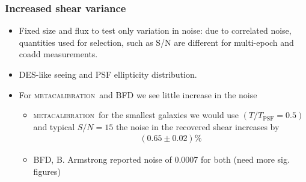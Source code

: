 \documentclass{beamer}
\newcommand{\mcal}{\textsc{metacalibration}}
\begin{document}
\frame
{
    \frametitle{Increased shear variance}

 
    \begin{itemize}

        \item Fixed size and flux to test only variation in noise: due to correlated
            noise, quantities used for selection, such as S/N are different for multi-epoch
            and coadd measurements.
            
        \item DES-like
            seeing and PSF ellipticity distribution.

        \item For \mcal\ and BFD we see little increase in the noise
            \begin{itemize}

                \item \mcal\ for the smallest galaxies we would use $(T/T_{\textrm{PSF}} = 0.5)$ and typical $S/N = 15$
                    the noise in the recovered shear increases by 
                    \begin{align}
                    (0.65 \pm 0.02) \%
                    \end{align}

                \item BFD, B. Armstrong reported noise of 0.0007 for both (need more sig. figures)

            \end{itemize}

    \end{itemize}

}
\end{document}
